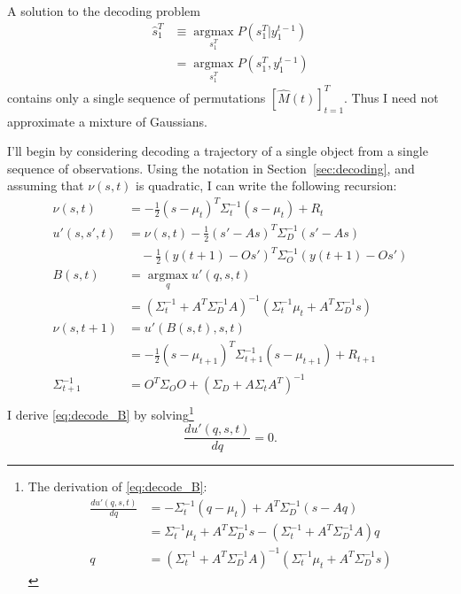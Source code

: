 \documentclass[12pt]{article}
\newcommand{\os}[4]{{\left[ #1(#2) \right]}_{#3}^{#4}} %
\newcommand{\ti}[2]{{#1}{(#2)}}                         %
\newcommand{\ts}[4]{\os{#1}{#2}{#2=#3}{#4}} %
\newcommand{\argmax}{\operatorname*{argmax}}
\begin{document}
A solution to the decoding problem
\begin{align*}
  \hat s_1^T &\equiv \argmax_{s_1^T} P(s_1^T|y_1^{t-1}) \\
            &=  \argmax_{s_1^T} P(s_1^T,y_1^{t-1})
\end{align*}
contains only a single sequence of permutations $\ts{\hat
  M}{t}{1}{T}$.  Thus I need not approximate a mixture of Gaussians.

I'll begin by considering decoding a trajectory of a single object
from a single sequence of observations.  Using the notation in
Section~\ref{sec:decoding}, and assuming that $\nu(s,t)$ is quadratic,
I can write the following recursion:
\begin{align}
  \nu(s,t) &= -\frac{1}{2}(s-\mu_{t})^T
    \Sigma_{t}^{-1}(s-\mu_{t}) + R_t \nonumber \\
  \label{eq:decode_u'}
  u'(s,s',t) &= \nu(s,t)  - 
  \frac{1}{2}(s'-As)^T \Sigma_{D}^{-1} (s'-As)  \nonumber \\
  &\quad - \frac{1}{2}(\ti{y}{t+1} - O s')^T \Sigma_{O}^{-1}(\ti{y}{t+1}
    - O s') \\
  B(s,t) &= \argmax_{q} u'(q,s,t) \nonumber \\
  \label{eq:decode_B}
  &= \left( \Sigma_t^{-1} + A^T \Sigma_D^{-1} A \right)^{-1} \left(
    \Sigma_t^{-1} \mu_t + A^T \Sigma_D^{-1} s \right) \\
  \nu(s,t+1) &= u'(B(s,t),s,t) \nonumber \\
  &=  -\frac{1}{2}(s-\mu_{t+1})^T
  \Sigma_{t+1}^{-1}(s-\mu_{t+1}) + R_{t+1} \nonumber \\
  \label{eq:new_Sigma}
  \Sigma_{t+1}^{-1} & = O^T\Sigma_O O + \left( \Sigma_D + A \Sigma_t
    A^T \right)^{-1} \\
  \label{eq:new_mu}
\end{align}
I derive \eqref{eq:decode_B} by solving\footnote{The derivation of
  \eqref{eq:decode_B}:
  \begin{align*}
    \frac{d u'(q,s,t)}{d q} &= -\Sigma_t^{-1}(q-\mu_t) + A^T \Sigma_D^{-1}
    (s - Aq) \\
    &= \Sigma_t^{-1}\mu_t + A^T \Sigma_D^{-1} s -(\Sigma_t^{-1} +
    A^T\Sigma_D^{-1}A)q \\
    q &= \left( \Sigma_t^{-1} + A^T\Sigma_D^{-1}A\right)^{-1} \left(
      \Sigma_t^{-1}\mu_t + A^T \Sigma_D^{-1} s \right)
  \end{align*}
}
\begin{equation*}
  \frac{d u'(q,s,t)}{d q} = 0.
\end{equation*}
\end{document}
